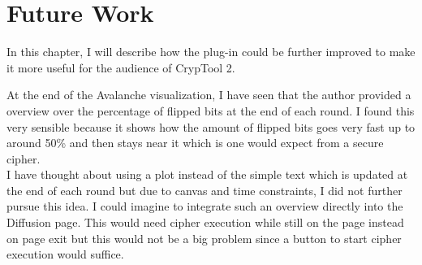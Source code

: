 
\chapter{Future Work}
\label{chap:futureWork}

In this chapter, I will describe how the plug-in could be further improved to make it more useful for the audience of CrypTool 2.

\begin{description}[style=nextline]

\item[Diffusion: Better overview over flipped bits at the end of each round]

At the end of the Avalanche visualization, I have seen that the author provided a overview over the percentage of flipped bits at the end of each round. I found this very sensible because it shows how the amount of flipped bits goes very fast up to around 50\% and then stays near it which is one would expect from a secure cipher. \\
I have thought about using a plot instead of the simple text which is updated at the end of each round but due to canvas and time constraints, I did not further pursue this idea. I could imagine to integrate such an overview directly into the Diffusion page. This would need cipher execution while still on the page instead on page exit but this would not be a big problem since a button to start cipher execution would suffice.

\item[Improve performance during diffusion]


\end{description}
